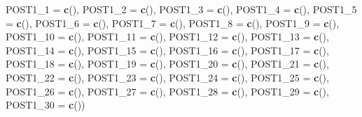 \documentclass[12pt,twoside]{reedthesis}
\newenvironment{Shaded}{\begin{snugshade}}{\end{snugshade}}
\newcommand{\DataTypeTok}[1]{\textcolor[rgb]{0.13,0.29,0.53}{#1}}
\newcommand{\KeywordTok}[1]{\textcolor[rgb]{0.13,0.29,0.53}{\textbf{#1}}}
\newcommand{\NormalTok}[1]{#1}
\begin{document}
\begin{Shaded}
\begin{Highlighting}[]
{  \DataTypeTok{POST1_1 =} \KeywordTok{c}\NormalTok{(), }\DataTypeTok{POST1_2 =} \KeywordTok{c}\NormalTok{(), }\DataTypeTok{POST1_3 =} \KeywordTok{c}\NormalTok{(), }\DataTypeTok{POST1_4 =} \KeywordTok{c}\NormalTok{(), }
  \DataTypeTok{POST1_5 =} \KeywordTok{c}\NormalTok{(), }\DataTypeTok{POST1_6 =} \KeywordTok{c}\NormalTok{(), }\DataTypeTok{POST1_7 =} \KeywordTok{c}\NormalTok{(), }\DataTypeTok{POST1_8 =} \KeywordTok{c}\NormalTok{(), }
  \DataTypeTok{POST1_9 =} \KeywordTok{c}\NormalTok{(), }\DataTypeTok{POST1_10 =} \KeywordTok{c}\NormalTok{(), }\DataTypeTok{POST1_11 =} \KeywordTok{c}\NormalTok{(), }\DataTypeTok{POST1_12 =} \KeywordTok{c}\NormalTok{(), }
  \DataTypeTok{POST1_13 =} \KeywordTok{c}\NormalTok{(), }\DataTypeTok{POST1_14 =} \KeywordTok{c}\NormalTok{(), }\DataTypeTok{POST1_15 =} \KeywordTok{c}\NormalTok{(), }\DataTypeTok{POST1_16 =} \KeywordTok{c}\NormalTok{(), }
  \DataTypeTok{POST1_17 =} \KeywordTok{c}\NormalTok{(), }\DataTypeTok{POST1_18 =} \KeywordTok{c}\NormalTok{(), }\DataTypeTok{POST1_19 =} \KeywordTok{c}\NormalTok{(), }\DataTypeTok{POST1_20 =} \KeywordTok{c}\NormalTok{(),}
  \DataTypeTok{POST1_21 =} \KeywordTok{c}\NormalTok{(), }\DataTypeTok{POST1_22 =} \KeywordTok{c}\NormalTok{(), }\DataTypeTok{POST1_23 =} \KeywordTok{c}\NormalTok{(), }\DataTypeTok{POST1_24 =} \KeywordTok{c}\NormalTok{(), }
  \DataTypeTok{POST1_25 =} \KeywordTok{c}\NormalTok{(), }\DataTypeTok{POST1_26 =} \KeywordTok{c}\NormalTok{(), }\DataTypeTok{POST1_27 =} \KeywordTok{c}\NormalTok{(), }\DataTypeTok{POST1_28 =} \KeywordTok{c}\NormalTok{(), }
  \DataTypeTok{POST1_29 =} \KeywordTok{c}\NormalTok{(), }\DataTypeTok{POST1_30 =} \KeywordTok{c}\NormalTok{())}

}
\end{Highlighting}
\end{Shaded}
\end{document}
